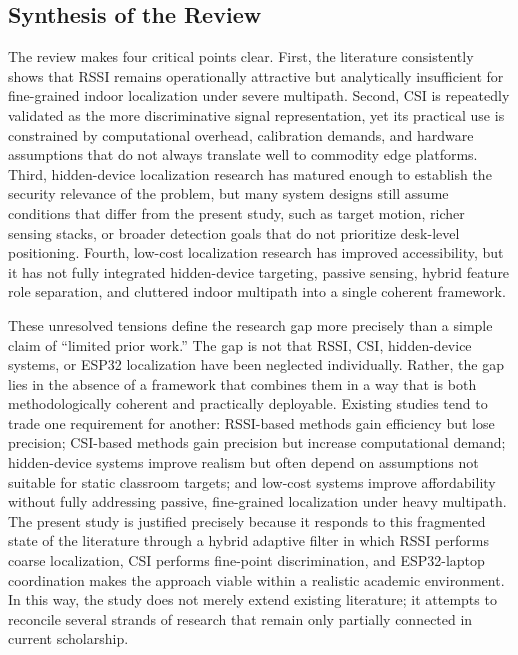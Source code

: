 \subsection{Synthesis of the Review}
The review makes four critical points clear. First, the literature consistently shows that RSSI remains operationally attractive but analytically insufficient for fine-grained indoor localization under severe multipath. Second, CSI is repeatedly validated as the more discriminative signal representation, yet its practical use is constrained by computational overhead, calibration demands, and hardware assumptions that do not always translate well to commodity edge platforms. Third, hidden-device localization research has matured enough to establish the security relevance of the problem, but many system designs still assume conditions that differ from the present study, such as target motion, richer sensing stacks, or broader detection goals that do not prioritize desk-level positioning. Fourth, low-cost localization research has improved accessibility, but it has not fully integrated hidden-device targeting, passive sensing, hybrid feature role separation, and cluttered indoor multipath into a single coherent framework.

These unresolved tensions define the research gap more precisely than a simple claim of ``limited prior work.'' The gap is not that RSSI, CSI, hidden-device systems, or ESP32 localization have been neglected individually. Rather, the gap lies in the absence of a framework that combines them in a way that is both methodologically coherent and practically deployable. Existing studies tend to trade one requirement for another: RSSI-based methods gain efficiency but lose precision; CSI-based methods gain precision but increase computational demand; hidden-device systems improve realism but often depend on assumptions not suitable for static classroom targets; and low-cost systems improve affordability without fully addressing passive, fine-grained localization under heavy multipath. The present study is justified precisely because it responds to this fragmented state of the literature through a hybrid adaptive filter in which RSSI performs coarse localization, CSI performs fine-point discrimination, and ESP32-laptop coordination makes the approach viable within a realistic academic environment. In this way, the study does not merely extend existing literature; it attempts to reconcile several strands of research that remain only partially connected in current scholarship.

